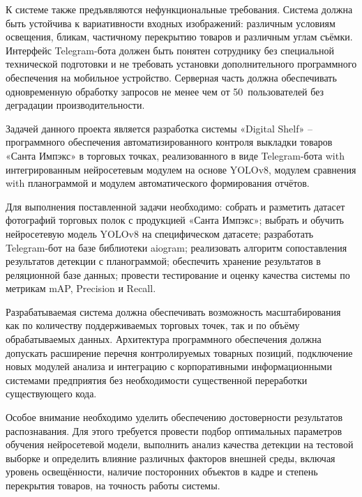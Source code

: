 {  \par \redline К системе также предъявляются нефункциональные требования.
  Система должна быть устойчива к вариативности входных изображений: различным
  условиям освещения, бликам, частичному перекрытию товаров и различным углам
  съёмки.
  Интерфейс Telegram-бота должен быть понятен сотруднику без специальной
  технической подготовки и не требовать установки дополнительного программного
  обеспечения на мобильное устройство.
  Серверная часть должна обеспечивать одновременную обработку запросов не менее
  чем от 50~пользователей без деградации производительности.

  \par \redline Задачей данного проекта является разработка системы «Digital Shelf»
  {--} программного обеспечения автоматизированного контроля выкладки товаров
  «Санта Импэкс» в торговых точках, реализованного в виде Telegram-бота
  with интегрированным нейросетевым модулем на основе YOLOv8, модулем сравнения
  with планограммой и модулем автоматического формирования отчётов.

  \par \redline Для выполнения поставленной задачи необходимо:
  собрать и разметить датасет фотографий торговых полок с продукцией «Санта Импэкс»;
  выбрать и обучить нейросетевую модель YOLOv8 на специфическом датасете;
  разработать Telegram-бот на базе библиотеки aiogram;
  реализовать алгоритм сопоставления результатов детекции с планограммой;
  обеспечить хранение результатов в реляционной базе данных;
  провести тестирование и оценку качества системы по метрикам mAP, Precision
  и Recall.

  \par \redline Разрабатываемая система должна обеспечивать возможность
  масштабирования как по количеству поддерживаемых торговых точек, так и по
  объёму обрабатываемых данных. Архитектура программного обеспечения должна
  допускать расширение перечня контролируемых товарных позиций, подключение новых
  модулей анализа и интеграцию с корпоративными информационными системами
  предприятия без необходимости существенной переработки существующего кода.

  \par \redline Особое внимание необходимо уделить обеспечению достоверности
  результатов распознавания. Для этого требуется провести подбор оптимальных
  параметров обучения нейросетевой модели, выполнить анализ качества детекции на
  тестовой выборке и определить влияние различных факторов внешней среды,
  включая уровень освещённости, наличие посторонних объектов в кадре и степень
  перекрытия товаров, на точность работы системы.

}
